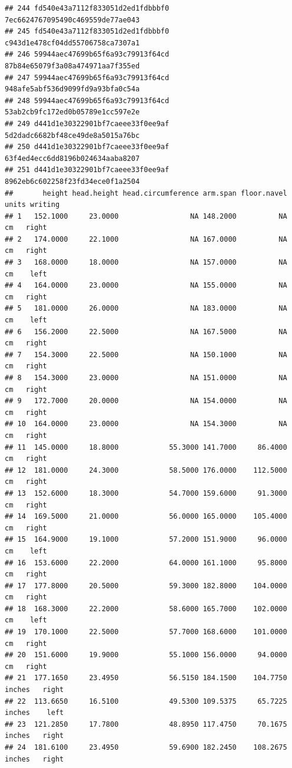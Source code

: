 \documentclass[]{article}
\begin{document}
\begin{verbatim}
## 244 fd540e43a7112f833051d2ed1fdbbbf0   7ec6624767095490c469559de77ae043
## 245 fd540e43a7112f833051d2ed1fdbbbf0   c943d1e478cf04dd55706758ca7307a1
## 246 59944aec47699b65f6a93c79913f64cd   87b84e65079f3a08a474971aa7f355ed
## 247 59944aec47699b65f6a93c79913f64cd   948afe5abf536d9099fd9a93bfa0c54a
## 248 59944aec47699b65f6a93c79913f64cd   53ab2cb9fc172ed0b05789e1cc597e2e
## 249 d441d1e30322901bf7caeee33f0ee9af   5d2dadc6682bf48ce49de8a5015a76bc
## 250 d441d1e30322901bf7caeee33f0ee9af   63f4ed4ecc6dd8196b024634aaba8207
## 251 d441d1e30322901bf7caeee33f0ee9af   8962eb6c602258f23fd34ece0f1a2504
##       height head.height head.circumference arm.span floor.navel  units writing
## 1   152.1000     23.0000                 NA 148.2000          NA     cm   right
## 2   174.0000     22.1000                 NA 167.0000          NA     cm   right
## 3   168.0000     18.0000                 NA 157.0000          NA     cm    left
## 4   164.0000     23.0000                 NA 155.0000          NA     cm   right
## 5   181.0000     26.0000                 NA 183.0000          NA     cm    left
## 6   156.2000     22.5000                 NA 167.5000          NA     cm   right
## 7   154.3000     22.5000                 NA 150.1000          NA     cm   right
## 8   154.3000     23.0000                 NA 151.0000          NA     cm   right
## 9   172.7000     20.0000                 NA 154.0000          NA     cm   right
## 10  164.0000     23.0000                 NA 154.3000          NA     cm   right
## 11  145.0000     18.8000            55.3000 141.7000     86.4000     cm   right
## 12  181.0000     24.3000            58.5000 176.0000    112.5000     cm   right
## 13  152.6000     18.3000            54.7000 159.6000     91.3000     cm   right
## 14  169.5000     21.0000            56.0000 165.0000    105.4000     cm   right
## 15  164.9000     19.1000            57.2000 151.9000     96.0000     cm    left
## 16  153.6000     22.2000            64.0000 161.1000     95.8000     cm   right
## 17  177.8000     20.5000            59.3000 182.8000    104.0000     cm   right
## 18  168.3000     22.2000            58.6000 165.7000    102.0000     cm    left
## 19  170.1000     22.5000            57.7000 168.6000    101.0000     cm   right
## 20  151.6000     19.9000            55.1000 156.0000     94.0000     cm   right
## 21  177.1650     23.4950            56.5150 184.1500    104.7750 inches   right
## 22  113.6650     16.5100            49.5300 109.5375     65.7225 inches    left
## 23  121.2850     17.7800            48.8950 117.4750     70.1675 inches   right
## 24  181.6100     23.4950            59.6900 182.2450    108.2675 inches   right

\end{verbatim}
\end{document}
